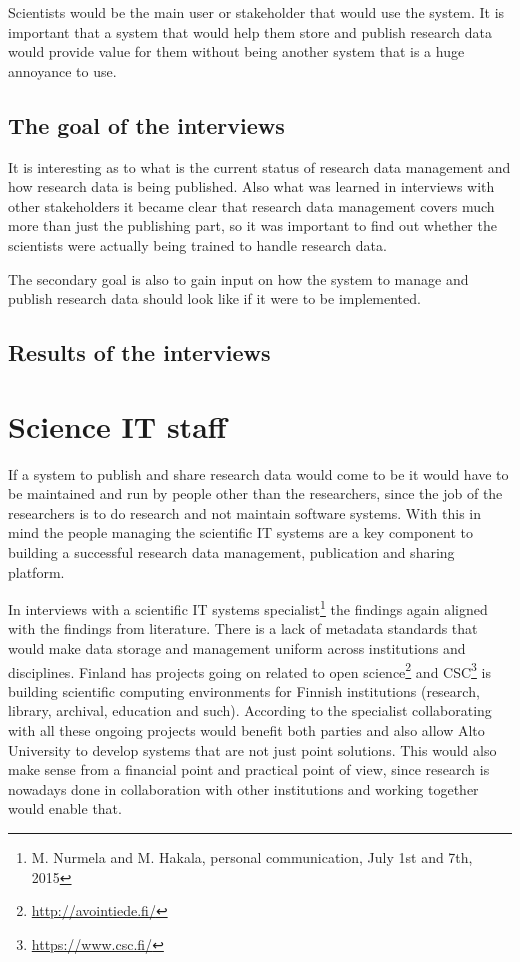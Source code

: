 Scientists would be the main user or stakeholder that would use the system. It
is important that a system that would help them store and publish research data
would provide value for them without being another system that is a huge
annoyance to use.

\subsection{The goal of the interviews}

It is interesting as to what is the current status of research data management
and how research data is being published. Also what was learned in interviews 
with other stakeholders it became clear that research data management covers
much more than just the publishing part, so it was important to find out
whether the scientists were actually being trained to handle research data.

The secondary goal is also to gain input on how the system to manage and
publish research data should look like if it were to be implemented.

\subsection{Results of the interviews}

\fi

\section{Science IT staff}
\label{sec:sci_it}

If a system to publish and share research data would come to be it would have
to be maintained and run by people other than the researchers, since the job of
the researchers is to do research and not maintain software systems. With this
in mind the people managing the scientific IT systems are a key component to
building a successful research data management, publication and sharing
platform.

In interviews with a scientific IT systems specialist\footnote{M. Nurmela and
M. Hakala, personal communication, July 1st and 7th, 2015} the findings again
aligned with the findings from literature. There is a lack of metadata
standards that would make data storage and management uniform across
institutions and disciplines. Finland has projects going on related to open
science\footnote{\url{http://avointiede.fi/}} and CSC\footnote{\url{https://www.csc.fi/}} is
building scientific computing environments for Finnish institutions (research,
library, archival, education and such). According to the specialist
collaborating with all these ongoing projects would benefit both parties and
also allow Alto University to develop systems that are not just point
solutions. This would also make sense from a financial point and practical
point of view, since research is nowadays done in collaboration with other
institutions and working together would enable that.

